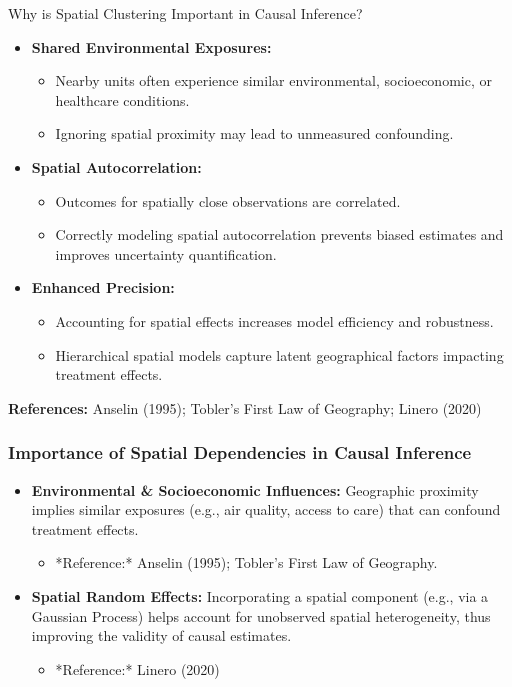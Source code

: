 \documentclass{beamer}
\begin{document}
    \begin{frame}{Why is Spatial Clustering Important in Causal Inference?}
        \begin{itemize}
          \item \textbf{Shared Environmental Exposures:}
            \begin{itemize}
              \item Nearby units often experience similar environmental, socioeconomic, or healthcare conditions.
              \item Ignoring spatial proximity may lead to unmeasured confounding.
            \end{itemize}
          \item \textbf{Spatial Autocorrelation:}
            \begin{itemize}
              \item Outcomes for spatially close observations are correlated.
              \item Correctly modeling spatial autocorrelation prevents biased estimates and improves uncertainty quantification.
            \end{itemize}
          \item \textbf{Enhanced Precision:}
            \begin{itemize}
              \item Accounting for spatial effects increases model efficiency and robustness.
              \item Hierarchical spatial models capture latent geographical factors impacting treatment effects.
            \end{itemize}
        \end{itemize}
        \vspace{0.3cm}
        \footnotesize \textbf{References:} Anselin (1995); Tobler's First Law of Geography; Linero (2020)
      \end{frame}
    \begin{frame}
        
    \frametitle{Importance of Spatial Dependencies in Causal Inference}
    \begin{itemize}
        \item \textbf{Environmental & Socioeconomic Influences:}  
              Geographic proximity implies similar exposures (e.g., air quality, access to care) that can confound treatment effects.
              \begin{itemize}
                  \item *Reference:* Anselin (1995); Tobler's First Law of Geography.
              \end{itemize}
        \item \textbf{Spatial Random Effects:}  
              Incorporating a spatial component (e.g., via a Gaussian Process) helps account for unobserved spatial heterogeneity, thus improving the validity of causal estimates.
              \begin{itemize}
                  \item *Reference:* Linero (2020)
              \end{itemize}
    \end{itemize}
    \end{frame}
\end{document}
